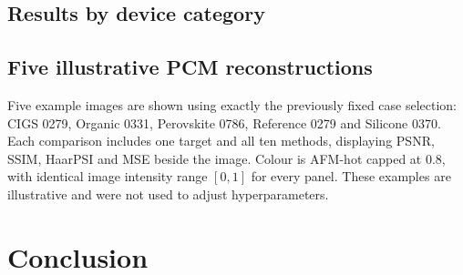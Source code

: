 \documentclass[10pt,a4paper]{article}
\begin{document}
\subsection*{Results by device category}
\begin{table}[htbp]
\centering\tiny
{}
\caption{Category mean PSNR in dB; 90 matched test cases per category.
The full ten-method category metrics and their sample standard
deviations are in the companion JSON and figure files.}
\end{table}

\subsection*{Five illustrative PCM reconstructions}
Five example images are shown using exactly the previously fixed case
selection: CIGS 0279, Organic 0331, Perovskite 0786, Reference 0279
and Silicone 0370. Each comparison includes one target and all ten
methods, displaying PSNR, SSIM, HaarPSI and MSE beside the image.
Colour is AFM-hot capped at 0.8, with identical image intensity
range $[0,1]$ for every panel. These examples are illustrative and
were not used to adjust hyperparameters.

\clearpage



\section{Conclusion}
\end{document}
